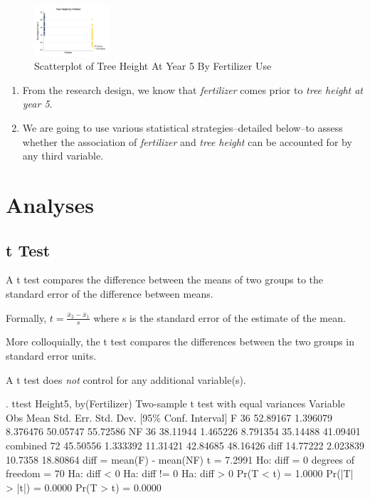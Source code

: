 \documentclass[
]{article}
\providecommand{\tightlist}{%
  \setlength{\itemsep}{0pt}\setlength{\parskip}{0pt}}
\begin{document}
\begin{figure}
\centering
\includegraphics[width=0.25\textwidth,height=\textheight]{myscatter.png}
\caption{Scatterplot of Tree Height At Year 5 By Fertilizer Use}
\end{figure}

\begin{enumerate}
\def\labelenumi{\arabic{enumi}.}
\setcounter{enumi}{1}
\tightlist
\item
  From the research design, we know that \emph{fertilizer} comes prior
  to \emph{tree height at year 5}.
\item
  We are going to use various statistical strategies--detailed below--to
  assess whether the association of \emph{fertilizer} and \emph{tree
  height} can be accounted for by any third variable.
\end{enumerate}

\hypertarget{analyses}{%
\section{Analyses 🌲}\label{analyses}}

\hypertarget{t-test}{%
\subsection{t Test}\label{t-test}}

A t test compares the difference between the means of two groups to the
standard error of the difference between means.

Formally, \(t = \frac{\bar{x}_2 - \bar{x}_1}{s}\) where s is the
standard error of the estimate of the mean.

More colloquially, the t test compares the differences between the two
groups in standard error units.

A t test does \emph{not} control for any additional variable(s).

\begin{stlog}
. ttest Height5, by(Fertilizer)
{\smallskip}
Two-sample t test with equal variances
Variable {\VBAR}     Obs        Mean    Std. Err.   Std. Dev.   [95\% Conf. Interval]
       F {\VBAR}      36    52.89167    1.396079    8.376476    50.05747    55.72586
      NF {\VBAR}      36    38.11944    1.465226    8.791354    35.14488    41.09401
combined {\VBAR}      72    45.50556    1.333392    11.31421    42.84685    48.16426
    diff {\VBAR}            14.77222    2.023839                 10.7358    18.80864
    diff = mean(F) - mean(NF)                                     t =   7.2991
Ho: diff = 0                                     degrees of freedom =       70
{\smallskip}
    Ha: diff < 0                 Ha: diff != 0                 Ha: diff > 0
 Pr(T < t) = 1.0000         Pr(|T| > |t|) = 0.0000          Pr(T > t) = 0.0000
\end{stlog}
\end{document}
